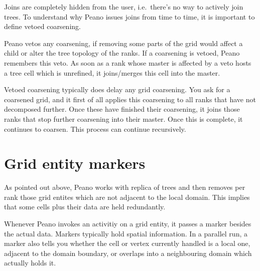 Joins are completely hidden from the user, i.e.~there's no way to actively join
trees. 
To understand why Peano issues joins from time to time, it is important to
define vetoed coarsening.

\begin{definition}
 Peano vetos any coarsening, if removing some parts of the grid would affect a
 child or alter the tree topology of the ranks.
 If a coarsening is vetoed, Peano remembers this veto. 
 As soon as a rank whose master is affected by a veto hosts a tree cell which is
 unrefined, it joins/merges this cell into the master.
\end{definition}

\noindent
Vetoed coarsening typically does delay any grid coarsening.
You ask for a coarsened grid, and it first of all applies this coarsening to all
ranks that have not decomposed further.
Once these have finished their coarsening, it joins those ranks that stop
further coarsening into their master.
Once this is complete, it continues to coarsen.
This process can continue recursively.


\section{Grid entity markers}

As pointed out above, Peano works with replica of trees and then removes per
rank those grid entites which are not adjacent to the local domain.
This implies that some cells plus their data are held redundantly.

Whenever Peano invokes an activitiy on a grid entity, it passes a marker besides
the actual data.
Markers typically hold spatial information.
In a parallel run, a marker also tells you whether the cell or vertex currently
handled is a local one, adjacent to the domain boundary, or overlaps into a
neighbouring domain which actually holds it.
